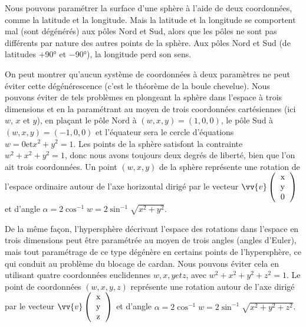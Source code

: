 Nous pouvons paramétrer la surface d'une sphère à l'aide de deux coordonnées, comme la latitude et la longitude. Mais la latitude et la longitude se comportent mal (sont dégénérés) aux pôles Nord et Sud, alors que les pôles ne sont pas différents par nature des autres points de la sphère. Aux pôles Nord et Sud (de latitudes $+$\ang{90} et $-$\ang{90}), la longitude perd son sens.

On peut montrer qu'aucun système de coordonnées à deux paramètres ne peut éviter cette dégénérescence (c'est le théorème de la boule chevelue). Nous pouvons éviter de tels problèmes en plongeant la sphère dans l'espace à trois dimensions et en la paramétrant au moyen de trois coordonnées cartésiennes (ici $w$, $x$ et $y$), en plaçant le pôle Nord à $(w, x, y) = (1, 0, 0)$, le pôle Sud à $(w, x, y) = ( -1, 0, 0)$ et l'équateur sera le cercle d'équations $w = 0 \text{et} x^2 + y^2 = 1$. Les points de la sphère satisfont la contrainte $w^2 + x^2 + y^2 = 1$, donc nous avons toujours deux degrés de liberté, bien que l'on ait trois coordonnées. Un point $(w, x, y)$ de la sphère représente une rotation de l'espace ordinaire autour de l'axe horizontal dirigé par le vecteur $\vv{v}
\left(
\begin{tabular}{c}
	x \\ y \\ 0 \\
\end{tabular}
\right)$
et d'angle $\alpha = 2\cos^{-1} w = 2 \sin^{-1}\sqrt{x^2+y^2}$.

De la même façon, l'hypersphère décrivant l'espace des rotations dans l'espace en trois dimensions peut être paramétrée au moyen de trois angles (angles d'Euler), mais tout paramétrage de ce type dégénère en certains points de l'hypersphère, ce qui conduit au problème du blocage de cardan. Nous pouvons éviter cela en utilisant quatre coordonnées euclidennes $w, x, y et z$, avec $w^2 + x^2 + y^2 + z^2 = 1$. Le point de coordonnées $(w, x, y, z)$ représente une rotation autour de l'axe dirigé par le vecteur $\vv{v}
\left(
\begin{tabular}{c}
x \\ y \\ z \\
\end{tabular}
\right)$
et d'angle $\alpha = 2\cos^{-1} w = 2 \sin^{-1}\sqrt{x^2+y^2+z^2}$.